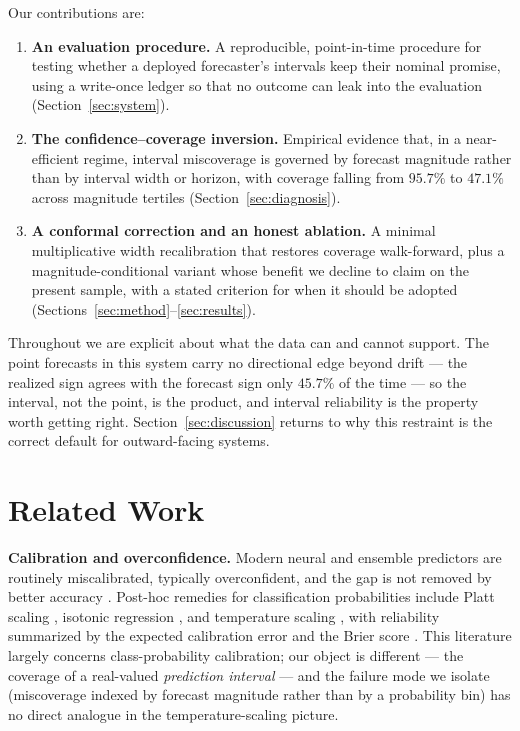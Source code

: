 \documentclass[11pt,a4paper]{article}
\begin{document}
Our contributions are:
\begin{enumerate}[leftmargin=1.6em,itemsep=2pt]
\item \textbf{An evaluation procedure.} A reproducible, point-in-time procedure for testing
whether a deployed forecaster's intervals keep their nominal promise, using a
write-once ledger so that no outcome can leak into the evaluation
(Section~\ref{sec:system}).
\item \textbf{The confidence--coverage inversion.} Empirical evidence that, in a
near-efficient regime, interval miscoverage is governed by forecast magnitude rather
than by interval width or horizon, with coverage falling from $95.7\%$ to $47.1\%$
across magnitude tertiles (Section~\ref{sec:diagnosis}).
\item \textbf{A conformal correction and an honest ablation.} A minimal multiplicative
width recalibration that restores coverage walk-forward, plus a magnitude-conditional
variant whose benefit we decline to claim on the present sample, with a stated
criterion for when it should be adopted (Sections~\ref{sec:method}--\ref{sec:results}).
\end{enumerate}
Throughout we are explicit about what the data can and cannot support. The point
forecasts in this system carry no directional edge beyond drift --- the realized
sign agrees with the forecast sign only $45.7\%$ of the time --- so the interval, not
the point, is the product, and interval reliability is the property worth getting
right. Section~\ref{sec:discussion} returns to why this restraint is the correct
default for outward-facing systems.

\section{Related Work}\label{sec:related}
\textbf{Calibration and overconfidence.} Modern neural and ensemble predictors are
routinely miscalibrated, typically overconfident, and the gap is not removed by
better accuracy \cite{guo2017,lakshminarayanan2017,ovadia2019}. Post-hoc remedies
for classification probabilities include Platt scaling \cite{platt1999}, isotonic
regression \cite{zadrozny2002}, and temperature scaling \cite{guo2017}, with
reliability summarized by the expected calibration error and the Brier score
\cite{naeini2015,brier1950}. This literature largely concerns class-probability
calibration; our object is different --- the coverage of a real-valued
\emph{prediction interval} --- and the failure mode we isolate (miscoverage indexed
by forecast magnitude rather than by a probability bin) has no direct analogue in the
temperature-scaling picture.
\end{document}
